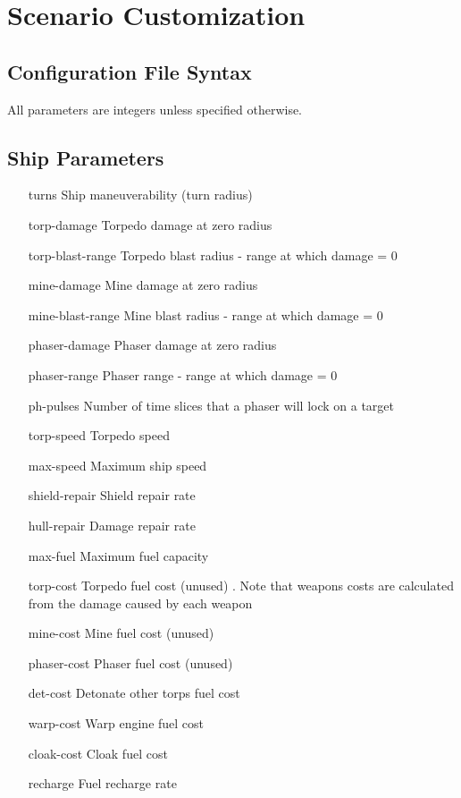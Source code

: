 \section{Scenario Customization}
\subsection{Configuration File Syntax}

All parameters are integers unless specified otherwise.

\subsection{Ship Parameters}
\begin{itemize}
\item[turns]  Ship maneuverability (turn radius)
\item[torp-damage]  Torpedo damage at zero radius
\item[torp-blast-range]  Torpedo blast radius - range at which damage = 0
\item[mine-damage] Mine damage at zero radius
\item[mine-blast-range]  Mine blast radius - range at which damage = 0
\item[phaser-damage] Phaser damage at zero radius
\item[phaser-range] Phaser range - range at which damage = 0
\item[ph-pulses]  Number of time slices that a phaser will lock on a target
\item[torp-speed]  Torpedo speed
\item[max-speed] Maximum ship speed
\item[shield-repair]  Shield repair rate
\item[hull-repair]  Damage repair rate
\item[max-fuel]  Maximum fuel capacity
\item[torp-cost] Torpedo fuel cost (unused) .  Note that weapons costs are
calculated from the damage caused by each weapon
\item[mine-cost] Mine fuel cost (unused)
\item[phaser-cost] Phaser fuel cost (unused)
\item[det-cost] Detonate other torps fuel cost
\item[warp-cost] Warp engine fuel cost
\item[cloak-cost] Cloak fuel cost
\item[recharge]  Fuel recharge rate

\end{itemize}
